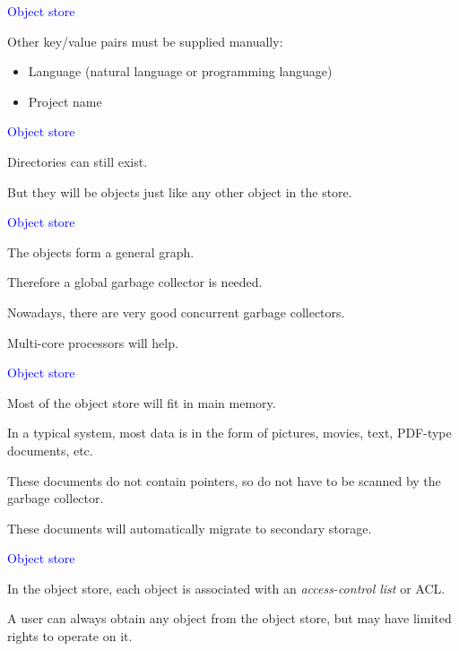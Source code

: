 \documentclass{slides}
\newcommand{\ti}[1]{\begin{center}\Large{\textcolor{blue}{#1}}\end{center}}
\begin{document}
\begin{slide}\ti{Object store}

Other key/value pairs must be supplied manually:

\begin{itemize}
\item Language (natural language or programming language)
\item Project name
\end{itemize}

\vfill\end{slide}
\begin{slide}\ti{Object store}

Directories can still exist.

But they will be objects just like any other object in the store.

\vfill\end{slide}
\begin{slide}\ti{Object store}

The objects form a general graph.

Therefore a global garbage collector is needed.

Nowadays, there are very good concurrent garbage collectors.

Multi-core processors will help.

\vfill\end{slide}
\begin{slide}\ti{Object store}

Most of the object store will fit in main memory.

In a typical system, most data is in the form of pictures, movies,
text, PDF-type documents, etc.

These documents do not contain pointers, so do not have to be scanned
by the garbage collector.

These documents will automatically migrate to secondary storage.

\vfill\end{slide}
\begin{slide}\ti{Object store}

In the object store, each object is associated with an
\emph{access-control list} or ACL.

A user can always obtain any object from the object store, but may
have limited rights to operate on it.

\vfill\end{slide}
\end{document}
